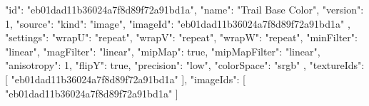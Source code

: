 {
  "id": "eb01dad11b36024a7f8d89f72a91bd1a",
  "name": "Trail Base Color",
  "version": 1,
  "source": {
    "kind": "image",
    "imageId": "eb01dad11b36024a7f8d89f72a91bd1a"
  },
  "settings": {
    "wrapU": "repeat",
    "wrapV": "repeat",
    "wrapW": "repeat",
    "minFilter": "linear",
    "magFilter": "linear",
    "mipMap": true,
    "mipMapFilter": "linear",
    "anisotropy": 1,
    "flipY": true,
    "precision": "low",
    "colorSpace": "srgb"
  },
  "textureIds": [
    "eb01dad11b36024a7f8d89f72a91bd1a"
  ],
  "imageIds": [
    "eb01dad11b36024a7f8d89f72a91bd1a"
  ]
}
